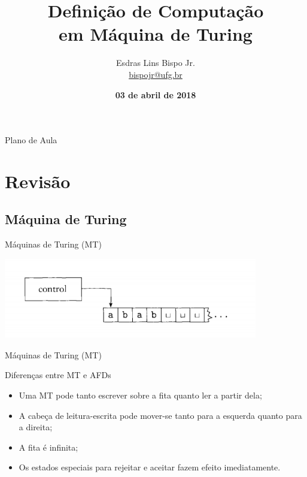 \documentclass[xcolor=dvipsnames,table]{beamer}
\title{Definição de Computação \\em Máquina de Turing}
\author{
  Esdras Lins Bispo Jr. \\ \url{bispojr@ufg.br}
  }
\institute{
  Teoria da Computação \\Bacharelado em Ciência da Computação}
\date{\textbf{03 de abril de 2018} }
\begin{document}
	\begin{frame}
		\titlepage
	\end{frame}

	\AtBeginSection{
		\begin{frame}{Sumário}%
    		\tableofcontents[currentsection]
		\end{frame}
	}

	\begin{frame}{Plano de Aula}
		\tableofcontents
	\end{frame}
	
	
	\section{Revisão}
	\subsection{Máquina de Turing}	
	\begin{frame}{Máquinas de Turing (MT)}
		\begin{center}
			\includegraphics[height=3.5cm]{images/fig31.png}
		\end{center}
	\end{frame}
	
	\begin{frame}{Máquinas de Turing (MT)}
		\begin{block}{Diferenças entre MT e AFDs}
			\begin{itemize}
				\item Uma MT pode tanto escrever sobre a fita quanto ler a partir dela;  
				\item A cabeça de leitura-escrita pode mover-se tanto para a esquerda quanto para a direita;  
				\item A fita é infinita;  
				\item Os estados especiais para rejeitar e aceitar fazem efeito imediatamente.
			\end{itemize}
		\end{block}
	\end{frame}
	
\end{document}
